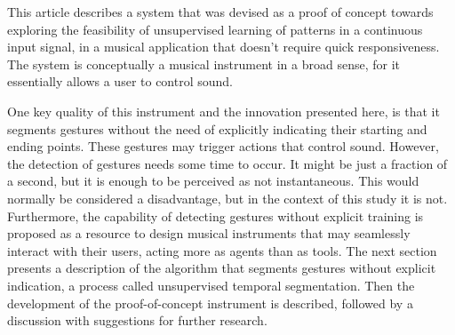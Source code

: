 \documentclass{nime-alternate_MANUSCRIPT} %
\begin{document}
This article describes a system that was devised as a proof of concept towards exploring the feasibility of unsupervised learning of patterns in a continuous input signal, in a musical application that doesn't require quick responsiveness. The system is conceptually a musical instrument in a broad sense, for it essentially allows a user to control sound.

One key quality of this instrument and the innovation presented here, is that it segments gestures without the need of explicitly indicating their starting and ending points. These gestures may trigger actions that control sound. However, the detection of gestures needs some time to occur. It might be just a fraction of a second, but it is enough to be perceived as not instantaneous. This would normally be considered a disadvantage, but in the context of this study it is not. Furthermore, the capability of detecting gestures without explicit training is proposed as a resource to design musical instruments that may seamlessly interact with their users, acting more as agents than as tools. The next section presents a description of the algorithm that segments gestures without explicit indication, a process called unsupervised temporal segmentation. Then the development of the proof-of-concept instrument is described, followed by a discussion with suggestions for further research.
\end{document}
